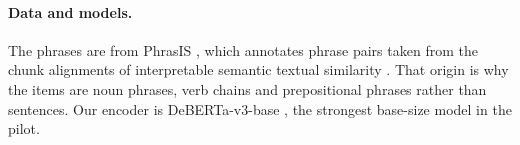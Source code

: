 \paragraph{Data and models.}
The phrases are from PhrasIS \citep{lopez-gazpio-etal-2024-phrasis}, which annotates phrase pairs taken from the chunk alignments of interpretable semantic textual similarity \citep{agirre-etal-2016-semeval-2016}. That origin is why the items are noun phrases, verb chains and prepositional phrases rather than sentences. Our encoder is DeBERTa-v3-base \citep{he-etal-2023-debertav3}, the strongest base-size model in the pilot.
